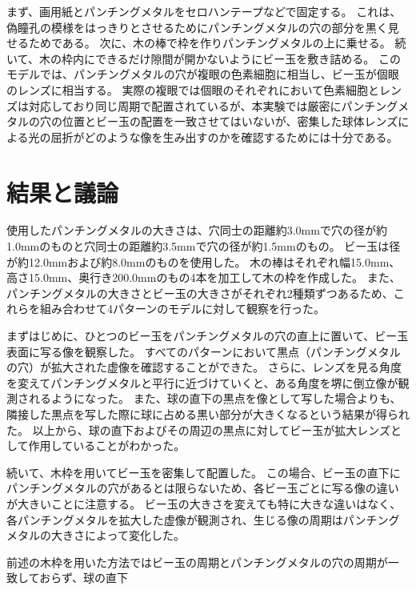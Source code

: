 \noindent
まず、画用紙とパンチングメタルをセロハンテープなどで固定する。
これは、偽瞳孔の模様をはっきりとさせるためにパンチングメタルの穴の部分を黒く見せるためである。
次に、木の棒で枠を作りパンチングメタルの上に乗せる。
続いて、木の枠内にできるだけ隙間が開かないようにビー玉を敷き詰める。
このモデルでは、パンチングメタルの穴が複眼の色素細胞に相当し、ビー玉が個眼のレンズに相当する。
実際の複眼では個眼のそれぞれにおいて色素細胞とレンズは対応しており同じ周期で配置されているが、本実験では厳密にパンチングメタルの穴の位置とビー玉の配置を一致させてはいないが、密集した球体レンズによる光の屈折がどのような像を生み出すのかを確認するためには十分である。

\section{結果と議論}
\label{SExperimentResult}

使用したパンチングメタルの大きさは、穴同士の距離約3.0mmで穴の径が約1.0mmのものと穴同士の距離約3.5mmで穴の径が約1.5mmのもの。
ビー玉は径が約12.0mmおよび約8.0mmのものを使用した。
木の棒はそれぞれ幅15.0mm、高さ15.0mm、奥行き200.0mmのもの4本を加工して木の枠を作成した。
また、パンチングメタルの大きさとビー玉の大きさがそれぞれ2種類ずつあるため、これらを組み合わせて4パターンのモデルに対して観察を行った。

まずはじめに、ひとつのビー玉をパンチングメタルの穴の直上に置いて、ビー玉表面に写る像を観察した。
すべてのパターンにおいて黒点（パンチングメタルの穴）が拡大された虚像を確認することができた\figref{}。
さらに、レンズを見る角度を変えてパンチングメタルと平行に近づけていくと、ある角度を堺に倒立像が観測されるようになった\figref{}。
また、球の直下の黒点を像として写した場合よりも、隣接した黒点を写した際に球に占める黒い部分が大きくなるという結果が得られた\figref{}。
以上から、球の直下およびその周辺の黒点に対してビー玉が拡大レンズとして作用していることがわかった。

続いて、木枠を用いてビー玉を密集して配置した\figref{}。
この場合、ビー玉の直下にパンチングメタルの穴があるとは限らないため、各ビー玉ごとに写る像の違いが大きいことに注意する。
ビー玉の大きさを変えても特に大きな違いはなく、各パンチングメタルを拡大した虚像が観測され、生じる像の周期はパンチングメタルの大きさによって変化した。

前述の木枠を用いた方法ではビー玉の周期とパンチングメタルの穴の周期が一致しておらず、球の直下



